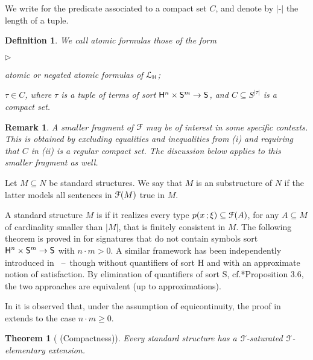 \documentclass{amsproc}
\newcommand{\mylabel}[1]{{#1}\hfill}
\renewenvironment{itemize}
  {\begin{list}{$\triangleright$}{%
  \setlength{\parskip}{0mm}
  \setlength{\topsep}{.1\baselineskip}
  \setlength{\rightmargin}{0mm}
  \setlength{\listparindent}{0mm}
  \setlength{\itemindent}{0mm}
  \setlength{\labelwidth}{3ex}
  \setlength{\itemsep}{.1\baselineskip}
  \setlength{\parsep}{.1\baselineskip}
  \setlength{\partopsep}{0mm}
  \setlength{\labelsep}{1ex}
  \setlength{\leftmargin}{\labelwidth+\labelsep}
  \let\makelabel\mylabel}}{%
\end{list}}
\newcounter{thm}
\theoremstyle{mio}
\newtheorem{theorem}[thm]{Theorem}\tcolorboxenvironment{theorem}{mythm}
\newtheorem{definition}[thm]{Definition}\tcolorboxenvironment{definition}{mythm}
\newtheorem{remark}[thm]{Remark}\tcolorboxenvironment{remark}{mythm}
\renewcommand*{\emph}[1]{%
   \smash{\tikz[baseline]\node[rectangle, fill=teal!25, rounded corners, inner xsep=0.5ex, inner ysep=0.2ex, anchor=base, minimum height = 2.7ex]{\strut #1};}}
\begin{document}
We write \emph{$x\in C$\/} for the predicate associated to a compact set $C$, and denote by $|\mbox{-}|$ the length of a tuple.

\begin{definition}
  We call atomic formulas those of the form
  \begin{itemize}
  \item[i.] atomic or negated atomic formulas of ${\EuScript L}_{\sf H}$;
  \item[ii.] $\tau\in C$, where $\tau$ is a tuple of terms of sort ${\sf H}^n\times {\sf S}^m\to {\sf S}$, and $C\subseteq S^{|\tau|}$ is a compact set.
  \end{itemize}
\end{definition}

\begin{remark}
  A smaller fragment of ${\EuScript F}$ may be of interest in some specific contexts.
  This is obtained by excluding equalities and inequalities from (i) and requiring that $C$ in (ii) is a regular compact set.
  The discussion below applies to this smaller fragment as well.
\end{remark}

 Let $M\subseteq N$ be standard structures.
 We say that $M$ is an \emph{${\EuScript F}$-elementary\/} substructure of $N$ if the latter models all sentences in ${\EuScript F}(M)$ true in $M$.

 A standard structure $M$ is \emph{${\EuScript F}$-saturated\/} if it realizes every type $p(x\,;\xi)\subseteq{\EuScript F}(A)$, for any $A\subseteq M$ of cardinality smaller than $|M|$, that is finitely consistent in $M$.
 The following theorem is proved in \cite{clcl} for signatures that do not contain symbols sort ${\sf H}^n\times{\sf S}^m\to {\sf S}$ with $n{\cdot}m>0$.
 A similar framework has been independently introduced in \cite{PC}~--~though without quantifiers of sort {\sf H} and with an approximate notion of satisfaction.
 By elimination of quantifiers of sort {\sf S}, cf.\@ \cite{clcl}*{Proposition 3.6}, the two approaches are equivalent (up to approximations).

 In \cite{Z} it is observed that, under the assumption of equicontinuity, the proof in \cite{clcl} extends to the case $n{\cdot}m\geq 0$.

 \begin{theorem}[ (Compactness)]%
  Every standard structure has a ${\EuScript F}$-saturated ${\EuScript F}$-elementary extension.
\end{theorem}
\end{document}
